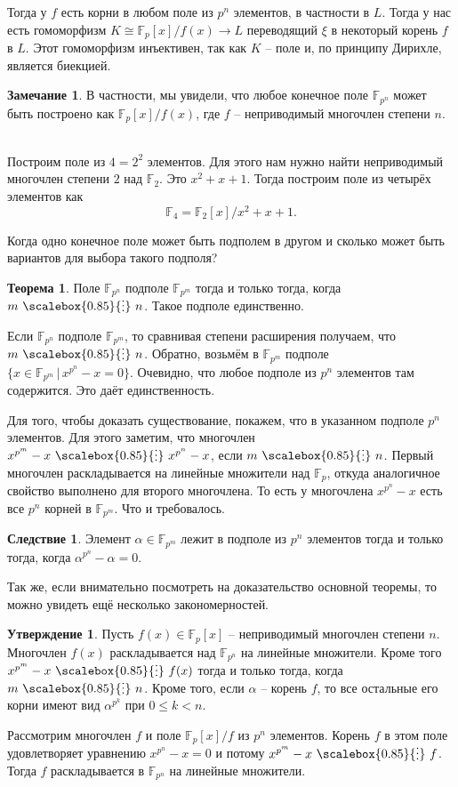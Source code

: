 \documentclass[12pt,a4paper,oneside]{book}
\theoremstyle{definition}
\newtheorem*{rem}{\color{green!50!blue}Замечание}
\newtheorem{thm}{\color{red!40!black}Теорема}
\newtheorem{cor}{\color{green!45!black}Следствие}
\newtheorem{utvr}{\color{blue!50!black}Утверждение}
\renewcommand{\leq}{\leqslant}
\newcommand{\di}{\mathop{\,\scalebox{0.85}{\raisebox{-1.2pt}[0.5\height]{\vdots}}\,}}
\newcommand{\F}{\mathbb F}
\def\thrm{\begin{thm}}
\def\ethrm{\end{thm}}
\def\crl{\begin{cor}}
\def\ecrl{\end{cor}}
\def\rm{\begin{rem}}
\def\erm{\end{rem}}
\def\utv{\begin{utvr}}
\def\eutv{\end{utvr}}
\begin{document}
Тогда у $f$ есть корни в любом поле из $p^n$ элементов, в частности в $L$. Тогда у нас есть гомоморфизм  $K\cong\F_p[x]/f(x)\to L$ переводящий $\xi$ в некоторый корень $f$ в $L$. Этот гомоморфизм инъективен, так как $K$ -- поле и, по принципу Дирихле, является биекцией. 
\endproof
 
\rm В частности, мы увидели, что любое конечное поле $\F_{p^n}$ может быть построено как $\F_p[x]/f(x)$, где $f$ -- неприводимый многочлен степени $n$.
\erm

\\
Построим поле из $4=2^2$ элементов. Для этого нам нужно найти неприводимый многочлен степени $2$ над $\F_2$. Это $x^2+x+1$. Тогда построим поле из четырёх элементов как
$$\F_4= \F_2[x]/x^2+x+1.$$

Когда одно конечное поле может быть подполем в другом и сколько может быть вариантов для выбора такого подполя?

\thrm Поле $\F_{p^n}$ подполе $\F_{p^m}$ тогда и только тогда, когда $m\di n$. Такое подполе единственно.
\ethrm 
\proof
Если $\F_{p^n}$ подполе $\F_{p^m}$, то сравнивая степени расширения получаем, что $m \di n$. Обратно, возьмём в $\F_{p^m}$ подполе $\{x \in \F_{p^m} \,|\, x^{p^n}-x=0\}$. Очевидно, что любое подполе из $p^n$ элементов там содержится. Это даёт единственность. 


Для того, чтобы доказать существование, покажем, что в указанном подполе $p^n$ элементов. Для этого заметим, что многочлен $x^{p^m}-x \di x^{p^n}-x$, если $m \di n$. Первый многочлен раскладывается на линейные множители над $\F_p$, откуда аналогичное свойство выполнено для второго многочлена. То есть у многочлена $x^{p^n}-x$ есть все $p^n$ корней в $\F_{p^m}$. Что и требовалось. 
\endproof
 



\crl Элемент $\alpha\in \F_{p^m}$ лежит в подполе из $p^n$ элементов тогда и только тогда, когда $\alpha^{p^n}-\alpha=0$.
\ecrl

Так же, если внимательно посмотреть на доказательство основной теоремы, то можно увидеть ещё несколько закономерностей.

\utv Пусть $f(x) \in \F_p[x]$ -- неприводимый многочлен степени $n$. Многочлен $f(x)$ раскладывается над $\F_{p^n}$ на линейные множители. Кроме того $x^{p^m}-x \di f(x)$ тогда и только тогда, когда $m\di n$. Кроме того, если $\alpha$ --  корень $f$, то все остальные его корни имеют вид $\alpha^{p^k}$ при $0\leq k<n$. 
\eutv
\proof Рассмотрим многочлен $f$ и поле $\F_p[x]/f$ из $p^n$ элементов. Корень $f$ в этом поле удовлетворяет уравнению $x^{p^n}-x=0$ и потому  $x^{p^m}-x \di f$. Тогда $f$ раскладывается в $\F_{p^n}$ на линейные множители. 
\end{document}
